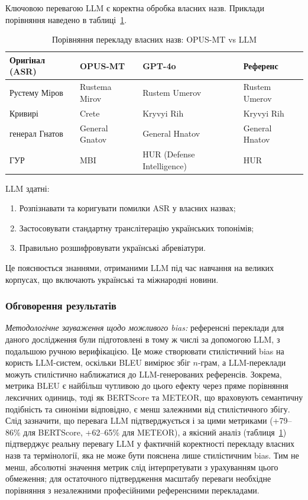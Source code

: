 Ключовою перевагою LLM є коректна обробка власних назв. Приклади порівняння
наведено в таблиці~\ref{tab:llm_names_comparison}.

\begin{table}[h]
\centering
\caption{Порівняння перекладу власних назв: OPUS-MT vs LLM}
\label{tab:llm_names_comparison}
\small
\begin{tabular}{|p{3cm}|p{3.5cm}|p{3.5cm}|p{3.5cm}|}
\hline
\textbf{Оригінал (ASR)} & \textbf{OPUS-MT} & \textbf{GPT-4o} & \textbf{Референс} \\
\hline
Рустему Міров & Rustema Mirov & Rustem Umerov & Rustem Umerov \\
\hline
Кривирі & Crete & Kryvyi Rih & Kryvyi Rih \\
\hline
генерал Гнатов & General Gnatov & General Hnatov & General Hnatov \\
\hline
ГУР & MBI & HUR (Defense Intelligence) & HUR \\
\hline
\end{tabular}
\end{table}

LLM здатні:
\begin{enumerate}[nosep]
    \item Розпізнавати та коригувати помилки ASR у власних назвах;
    \item Застосовувати стандартну транслітерацію українських топонімів;
    \item Правильно розшифровувати українські абревіатури.
\end{enumerate}

Це пояснюється знаннями, отриманими LLM під час навчання на великих
корпусах, що включають українські та міжнародні новини.

\subsubsection{Обговорення результатів}

\textit{Методологічне зауваження щодо можливого bias:} референсні
переклади для даного дослідження були підготовлені в тому ж числі за допомогою LLM, з подальшою ручною верифікацією. Це може створювати
стилістичний bias на користь LLM-систем, оскільки BLEU вимірює збіг
$n$-грам, а LLM-переклади можуть стилістично наближатися до
LLM-генерованих референсів. Зокрема, метрика BLEU є найбільш чутливою
до цього ефекту через пряме порівняння лексичних одиниць, тоді як
BERTScore та METEOR, що враховують семантичну подібність та синоніми
відповідно, є менш залежними від стилістичного збігу. Слід зазначити,
що перевага LLM підтверджується і за цими метриками (+79--86\% для
BERTScore, +62--65\% для METEOR), а якісний аналіз
(таблиця~\ref{tab:llm_names_comparison}) підтверджує реальну перевагу
LLM у фактичній коректності перекладу власних назв та термінології,
яка не може бути пояснена лише стилістичним bias. Тим не менш,
абсолютні значення метрик слід інтерпретувати з урахуванням цього
обмеження; для остаточного підтвердження масштабу переваги необхідне
порівняння з незалежними професійними референсними перекладами.

